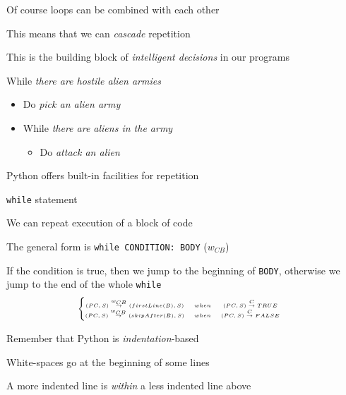 \documentclass{beamer}
\begin{document}
\begin{slide}{
\item Of course loops can be combined with each other
\item This means that we can \textit{cascade} repetition
\item This is the building block of \textit{intelligent decisions} in our programs
}\end{slide}

\begin{slide}{
\item While \textit{there are hostile alien armies}
\begin{itemize}
\item Do \textit{pick an alien army}
\item While \textit{there are aliens in the army}
\begin{itemize}
\item Do \textit{attack an alien}
\end{itemize}
\end{itemize}
}\end{slide}

\begin{slide}{
\item Python offers built-in facilities for repetition
\item \texttt{while} statement
\item We can repeat execution of a block of code
}\end{slide}

\begin{slide}{
\item The general form is \texttt{while CONDITION: BODY} ($w_{CB}$)
\item If the condition is true, then we jump to the beginning of \texttt{BODY}, otherwise we jump to the end of the whole \texttt{while}
$$
\tiny
\left\{
\begin{matrix}
(PC,S) \overset{w_{CB}}{\rightarrow} (firstLine(B),S) &when& (PC,S) \overset{C}{\rightarrow} TRUE & \\
(PC,S) \overset{w_{CB}}{\rightarrow} (skipAfter(B),S) &when& (PC,S) \overset{C}{\rightarrow} FALSE & \\
\end{matrix}
\right.
$$
}\end{slide}

\begin{slide}{
\item Remember that Python is \textit{indentation}-based
\item White-spaces go at the beginning of some lines
\item A more indented line is \textit{within} a less indented line above
}\end{slide}
\end{document}
